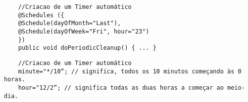 \documentclass{article}
\begin{document}
\begin{lstlisting}
    //Criacao de um Timer automático
    @Schedules ({
    @Schedule(dayOfMonth="Last"),
    @Schedule(dayOfWeek="Fri", hour="23")
    })
    public void doPeriodicCleanup() { ... }
\end{lstlisting}

\begin{lstlisting}
    //Criacao de um Timer automático
    minute="*/10“; // significa, todos os 10 minutos começando às 0 horas.
    hour="12/2“; // significa todas as duas horas a começar ao meio-dia.
\end{lstlisting}
\end{document}
